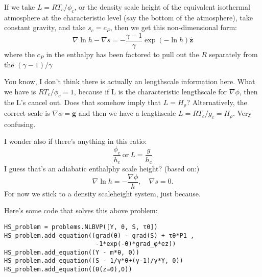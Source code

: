 \documentclass{aastex62}
\newcommand{\del}{\nabla}
\renewcommand{\vec}{\boldsymbol}
\begin{document}
If we take $L = R T_c/\phi_c$, or the density scale height of the equivalent isothermal atmosphere at the characteristic level (say the bottom of the atmosphere), take constant gravity, and take $s_c = c_P$, then we get this non-dimensional form:
\begin{equation}
  \del \ln h  - \del s = - \frac{\gamma-1}{\gamma}\exp{(-\ln h)} \vec{\hat{z}}
\end{equation}
where the $c_P$ in the enthalpy has been factored to pull out the $R$ separately from the $(\gamma-1)/\gamma$

You know, I don't think there is actually an lengthscale information here.  What we have is $R T_c/\phi_c = 1$, because if L is the characteristic lengthscale for $\del \phi$, then the L's cancel out.  Does that somehow imply that $L=H_\rho$?  Alternatively, the correct scale is $\del \phi = \vec{g}$ and then we have a lengthscale $ L = R T_c/g_c = H_\rho$.  Very confusing.

I wonder also if there's anything in this ratio:
\begin{equation}
  \frac{\phi_c}{h_c}~\text{or}~L=\frac{g}{h_c}
\end{equation}
I guess that's an adiabatic enthalphy scale height?
(based on:)
\begin{equation}
  \del \ln h = - \frac{\del \phi}{h}, \quad \del s = 0.
\end{equation}
For now we stick to a density scaleheight system, just because.

Here's some code that solves this above problem:
\begin{lstlisting}
HS_problem = problems.NLBVP([Υ, θ, S, τθ])
HS_problem.add_equation((grad(θ) - grad(S) + τθ*P1 ,
                         -1*exp(-θ)*grad_φ*ez))
HS_problem.add_equation((Υ - m*θ, 0))
HS_problem.add_equation((S - 1/γ*θ+(γ-1)/γ*Υ, 0))
HS_problem.add_equation((θ(z=0),0))
\end{lstlisting}
\end{document}
